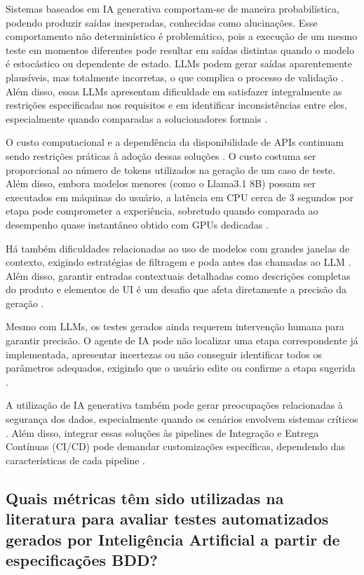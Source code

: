 Sistemas baseados em IA generativa comportam-se de maneira probabilística, podendo produzir saídas inesperadas, conhecidas como alucinações. Esse comportamento não determinístico é problemático, pois a execução de um mesmo teste em momentos diferentes pode resultar em saídas distintas quando o modelo é estocástico ou dependente de estado. LLMs podem gerar saídas aparentemente plausíveis, mas totalmente incorretas, o que complica o processo de validação \cite{Freeman2025}. Além disso, essas LLMs apresentam dificuldade em satisfazer integralmente as restrições especificadas nos requisitos e em identificar inconsistências entre eles, especialmente quando comparadas a solucionadores formais \cite{Babikian2025}.

O custo computacional e a dependência da disponibilidade de APIs continuam sendo restrições práticas à adoção dessas soluções \cite{Pysmennyi2025}. O custo costuma ser proporcional ao número de tokens utilizados na geração de um caso de teste. Além disso, embora modelos menores (como o Llama3.1 8B) possam ser executados em máquinas do usuário, a latência em CPU cerca de 3 segundos por etapa  pode comprometer a experiência, sobretudo quando comparada ao desempenho quase instantâneo obtido com GPUs dedicadas \cite{Paduraru2025}.

Há também dificuldades relacionadas ao uso de modelos com grandes janelas de contexto, exigindo estratégias de filtragem e poda antes das chamadas ao LLM \cite{Paduraru2025}. Além disso, garantir entradas contextuais detalhadas como descrições completas do produto e elementos de UI é um desafio que afeta diretamente a precisão da geração \cite{Ferreira2025}.

Mesmo com LLMs, os testes gerados ainda requerem intervenção humana para garantir precisão. O agente de IA pode não localizar uma etapa correspondente já implementada, apresentar incertezas ou não conseguir identificar todos os parâmetros adequados, exigindo que o usuário edite ou confirme a etapa sugerida \cite{Paduraru2025}.

A utilização de IA generativa também pode gerar preocupações relacionadas à segurança dos dados, especialmente quando os cenários envolvem sistemas críticos \cite{Ferreira2025}. Além disso, integrar essas soluções às pipelines de Integração e Entrega Contínuas (CI/CD) pode demandar customizações específicas, dependendo das características de cada pipeline \cite{Ferreira2025}.

\subsection{Quais métricas têm sido utilizadas na literatura para avaliar testes automatizados gerados por Inteligência Artificial a partir de especificações BDD?}
\label{qp:10}

